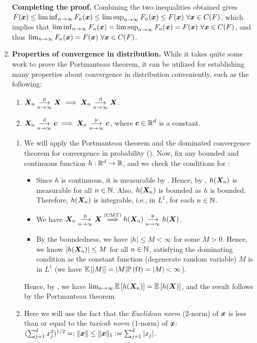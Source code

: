 \begin{enumerate}
\begin{pf}
\textbf{Completing the proof.} Combining the two inequalities obtained gives
\(F(\bm{x})\le\liminf_{n\to \infty}F_n(\bm{x})\le\limsup_{n\to
\infty}F_n(\bm{x}) \le F(\bm{x})~\forall \bm{x}\in C(F)\), which implies
that \(\liminf_{n\to \infty}F_n(\bm{x})=\limsup_{n\to
\infty}F_n(\bm{x})=F(\bm{x})~\forall \bm{x}\in C(F)\), and thus
\(\lim_{n\to\infty}F_n(\bm{x})=F(\bm{x})~\forall \bm{x}\in C(F)\).
\end{pf}
\item\label{it:conv-d-prop} \textbf{Properties of convergence in distribution.}
While it takes quite some work to prove the Portmanteau theorem, it can be
utilized for establishing many properties about convergence in distribution
conveniently, such as the following:
\begin{enumerate}
\item \(\bm{X}_n\underset{n\to\infty}{\overset{\text{p}}{\longrightarrow}} \bm{X}\implies \bm{X}_n\underset{n\to\infty}{\overset{\text{d}}{\longrightarrow}}\bm{X}\).
\item \(\bm{X}_n\underset{n\to\infty}{\overset{\text{d}}{\longrightarrow}} \bm{c}\implies \bm{X}_n\underset{n\to\infty}{\overset{\text{p}}{\longrightarrow}}\bm{c}\), where
\(\bm{c}\in\mathbb{R}^d\) is a constant.
\end{enumerate}
\begin{pf}
\begin{enumerate}
\item We will apply the Portmanteau theorem and the dominated convergence
theorem for convergence in probability (). Now, fix
any bounded and continuous function \(h:\mathbb{R}^d\to\mathbb{R}\), and we check the
conditions for :
\begin{itemize}
\item Since \(h\) is continuous, it is measurable by
. Hence, by ,
\(h(\bm{X}_n)\) is measurable for all \(n\in\mathbb{N}\). Also, \(h(\bm{X}_n)\) is
bounded as \(h\) is bounded. Therefore, \(h(\bm{X}_n)\) is integrable, i.e.,
in \(L^1\), for each \(n\in\mathbb{N}\).
\item We have \(\bm{X}_n\underset{n\to\infty}{\overset{\text{p}}{\longrightarrow}}\bm{X}\overset{\text{(CMT)}}{\implies
}h(\bm{X}_n)\underset{n\to\infty}{\overset{\text{p}}{\longrightarrow}} h(\bm{X})\).
\item By the boundedness, we have \(|h|\le M<\infty\) for some \(M>0\). Hence,
we know \(|h(\bm{X}_n)|\le M\) for all \(n\in\mathbb{N}\), satisfying the dominating
condition as the constant function (degenerate random variable) \(M\) is in
\(L^1\) (we have \(\mathbb{E}\left[|M|\right]=|M|\mathbb{P}\left(\Omega\right)=|M|<\infty\)).
\end{itemize}
Hence, by , we have
\(\lim_{n\to\infty}\mathbb{E}\left[h(\bm{X}_n)\right]=\mathbb{E}\left[h(\bm{X})\right]\), and the result
follows by the Portmanteau theorem.
\item Here we will use the fact that the \emph{Euclidean norm} (2-norm) of
\(\bm{x}\) is less than or equal to the \emph{taxicab norm} (1-norm) of
\(\bm{x}\):
\((\sum_{j=1}^{d}x_j^{2})^{1/2}=:\|\bm{x}\|\le\|\bm{x}\|_{1}:=\sum_{j=1}^{d}|x_j|\).


\end{enumerate}
\end{pf}
\end{enumerate}
